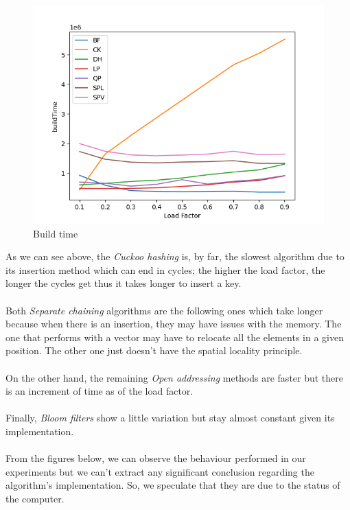 \documentclass{article}
\begin{document}
        \begin{figure}[!h]
        \begin{center}
          \includegraphics[width=\linewidth]{images/loadFactor_vs_buildTime.png}
          \caption{Build time}\label{fig:plot1}
        \endminipage
        \end{center}
        \end{figure}
    
    As we can see above, the \textit{Cuckoo hashing} is, by far, the slowest algorithm due to its insertion method which can end in cycles; the higher the load factor, the longer the cycles get thus it takes longer to insert a key. \\\\
    Both \textit{Separate chaining} algorithms are the following ones which take longer because when there is an insertion, they may have issues with the memory. The one that performs with a vector may have to relocate all the elements in a given position. The other one just doesn't have the spatial locality principle. \\\\
    On the other hand, the remaining \textit{Open addressing} methods are faster but there is an increment of time as of the load factor. \\\\
    Finally, \textit{Bloom filters} show a little variation but stay almost constant given its implementation. \\\\
    
    From the figures below, we can observe the behaviour performed in our experiments but we can't extract any significant conclusion regarding the algorithm's implementation. So, we speculate that they are due to the status of the computer.
    
\end{document}
